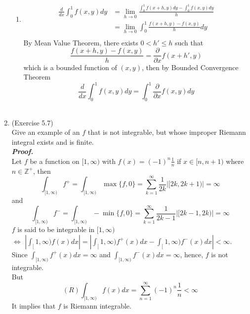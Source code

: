 \documentclass[a4paper,11pt]{article}
\begin{document}
\begin{enumerate}
\begin{enumerate}
 \item
 $$\begin{aligned}
 \frac{d}{dx} \int_{0}^{1} f(x,y) dy
 &= \underset{h \to 0}{\lim} \frac{\int_0^1 f(x+h,y)dy - \int_0^1 f(x,y) dy}{h}\\
 &= \underset{h \to 0}{\lim} \int_0^1 \frac{f(x+h,y) - f(x,y)}{h} dy\\
 \end{aligned}$$
 By Mean Value Theorem, there exists $0 < h' \leq h$ such that
 $$\frac{f(x+h,y) - f(x,y)}{h} = \frac{\partial}{\partial x} f(x+h',y)$$
 which is a bounded function of $(x,y)$, then by Bounded Convergence Theorem
 $$\frac{d}{dx} \int_{0}^{1} f(x,y) dy = \int_{0}^{1} \frac{\partial}{ \partial x} f(x, y) dy$$\

 \end{enumerate}








\item (Exercise 5.7)\\
 Give an example of an $f$ that is not integrable, but whose improper Riemann integral exists and is finite.\\
\newline
\textit{\textbf {Proof.}}\\
 Let $f$ be a function on $[1, \infty)$ with $f(x) = (-1)^n \frac{1}{n}$ if $x \in [n,n+1)$ where $n \in \mathbb{Z}^+$, then
 $$\int_{[1,\infty)} f^+ = \int_{[1,\infty)} \max{\{ f, 0\}} =\sum_{k=1}^{\infty} \frac{1}{2k} |[2k, 2k+1)| = \infty$$
 and
 $$\int_{[1,\infty)} f^- = \int_{[1,\infty)} -\min{\{ f, 0\}} =\sum_{k=1}^{\infty} \frac{1}{2k-1} |[2k-1, 2k)| = \infty$$
 $f$ is said to be integrable in $[1,\infty)$\\
 $\iff$ $|\int_[1,\infty) f(x) dx| = |\int_[1,\infty) f^+(x) dx - \int_[1,\infty) f^-(x) dx| < \infty$.\\

 Since $\int_{[1,\infty)} f^+(x) dx = \infty$ and $\int_{[1,\infty)} f^-(x) dx = \infty$, hence, $f$ is not integrable.\\

 But
 $$(R) \int_{[1,\infty)} f(x) dx = \sum_{n = 1}^{\infty} (-1)^n \frac{1}{n} < \infty$$
 It implies that $f$ is Riemann integrable.\\










\end{enumerate}
\end{document}
